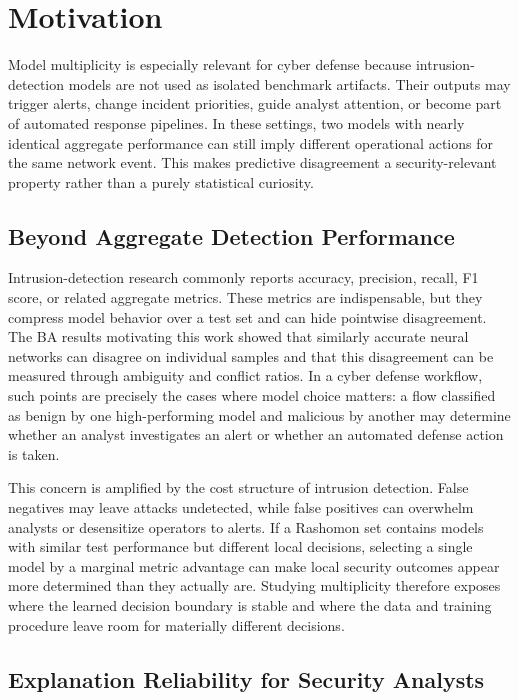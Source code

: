 \section{Motivation}

Model multiplicity is especially relevant for cyber defense because intrusion-detection models are not used as isolated benchmark artifacts. Their outputs may trigger alerts, change incident priorities, guide analyst attention, or become part of automated response pipelines. In these settings, two models with nearly identical aggregate performance can still imply different operational actions for the same network event. This makes predictive disagreement a security-relevant property rather than a purely statistical curiosity.

\subsection{Beyond Aggregate Detection Performance}

Intrusion-detection research commonly reports accuracy, precision, recall, F1 score, or related aggregate metrics. These metrics are indispensable, but they compress model behavior over a test set and can hide pointwise disagreement. The BA results motivating this work showed that similarly accurate neural networks can disagree on individual samples and that this disagreement can be measured through ambiguity and conflict ratios. In a cyber defense workflow, such points are precisely the cases where model choice matters: a flow classified as benign by one high-performing model and malicious by another may determine whether an analyst investigates an alert or whether an automated defense action is taken.

This concern is amplified by the cost structure of intrusion detection. False negatives may leave attacks undetected, while false positives can overwhelm analysts or desensitize operators to alerts. If a Rashomon set contains models with similar test performance but different local decisions, selecting a single model by a marginal metric advantage can make local security outcomes appear more determined than they actually are. Studying multiplicity therefore exposes where the learned decision boundary is stable and where the data and training procedure leave room for materially different decisions.

\subsection{Explanation Reliability for Security Analysts}

